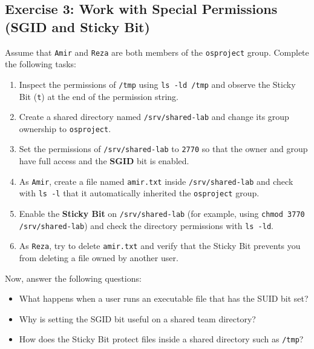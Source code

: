 \subsection{Exercise 3: Work with Special Permissions (SGID and Sticky Bit)}
Assume that \texttt{Amir} and \texttt{Reza} are both members of the \texttt{osproject} group. Complete the following tasks:
\begin{enumerate}
	\item Inspect the permissions of \texttt{/tmp} using \texttt{ls -ld /tmp} and observe the Sticky Bit (\texttt{t}) at the end of the permission string.
	\item Create a shared directory named \texttt{/srv/shared-lab} and change its group ownership to \texttt{osproject}.
	\item Set the permissions of \texttt{/srv/shared-lab} to \texttt{2770} so that the owner and group have full access and the \textbf{SGID} bit is enabled.
	\item As \texttt{Amir}, create a file named \texttt{amir.txt} inside \texttt{/srv/shared-lab} and check with \texttt{ls -l} that it automatically inherited the \texttt{osproject} group.
	\item Enable the \textbf{Sticky Bit} on \texttt{/srv/shared-lab} (for example, using \texttt{chmod 3770 /srv/shared-lab}) and check the directory permissions with \texttt{ls -ld}.
	\item As \texttt{Reza}, try to delete \texttt{amir.txt} and verify that the Sticky Bit prevents you from deleting a file owned by another user.
\end{enumerate}

Now, answer the following questions:
\begin{itemize}
	\item What happens when a user runs an executable file that has the SUID bit set?
	\item Why is setting the SGID bit useful on a shared team directory?
	\item How does the Sticky Bit protect files inside a shared directory such as \texttt{/tmp}?
\end{itemize}

